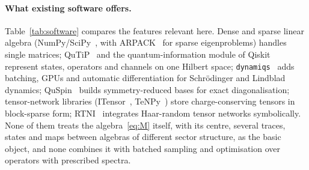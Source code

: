 \documentclass[11pt]{article}
\begin{document}
\paragraph{What existing software offers.} Table~\ref{tab:software} compares the features relevant here.
Dense and sparse linear algebra (NumPy/SciPy~\cite{harris2020,virtanen2020}, with ARPACK~\cite{lehoucq1998} for
sparse eigenproblems) handles single matrices; QuTiP~\cite{johansson2013} and the quantum-information module of
Qiskit~\cite{qiskit2019} represent states, operators and channels on one Hilbert space; \texttt{dynamiqs}~\cite{dynamiqs}
adds batching, GPUs and automatic differentiation for Schrödinger and Lindblad dynamics; QuSpin~\cite{weinberg2017}
builds symmetry-reduced bases for exact diagonalisation; tensor-network libraries (ITensor~\cite{fishman2022},
TeNPy~\cite{hauschild2018}) store charge-conserving tensors in block-sparse form; RTNI~\cite{fukuda2019} integrates
Haar-random tensor networks symbolically. None of them treats the algebra~\eqref{eq:M} itself, with its centre,
several traces, states and maps between algebras of different sector structure, as the basic object, and none
combines it with batched sampling and optimisation over operators with prescribed spectra.
\end{document}
